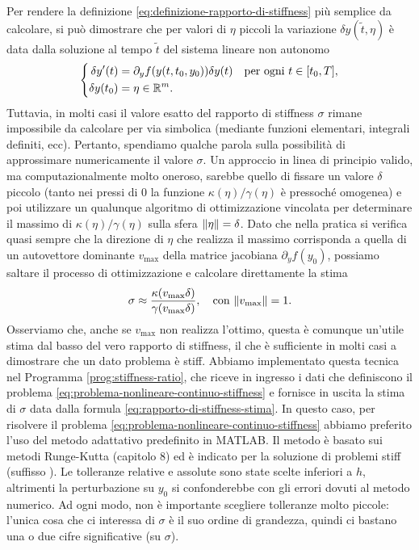 Per rendere la definizione \eqref{eq:definizione-rapporto-di-stiffness} più
semplice da calcolare, si può dimostrare che per valori di $\eta$ piccoli
la variazione $\delta y(\tilde{t},\eta)$ è data dalla soluzione al tempo $\tilde{t}$
del sistema lineare non autonomo
\[
\left\{
\begin{aligned}
\delta y'(t)  &= \partial_y f(y(t,t_0,y_0)) \delta y(t)
	\quad \text{per ogni $t \in [t_0,T]$}, \\
\delta y(t_0) &= \eta \in \mathbb{R}^m.
\end{aligned}
\right.
\]
Tuttavia, in molti casi il valore esatto del rapporto di stiffness $\sigma$
rimane impossibile da calcolare per via simbolica (mediante funzioni elementari,
integrali definiti, ecc). Pertanto, spendiamo qualche parola sulla possibilità
di approssimare numericamente il valore $\sigma$. Un approccio in linea
di principio valido, ma computazionalmente molto oneroso, sarebbe quello
di fissare un valore $\delta$ piccolo (tanto nei pressi di 0 la funzione
$\kappa(\eta)/\gamma(\eta)$ è pressoché omogenea) e poi utilizzare un
qualunque algoritmo di ottimizzazione vincolata per determinare il massimo
di $\kappa(\eta)/\gamma(\eta)$ sulla sfera $\left\lVert\eta\right\rVert = \delta$.
Dato che nella pratica si verifica quasi sempre che la direzione di $\eta$
che realizza il massimo corrisponda a quella di un autovettore dominante
$v_{\text{max}}$ della matrice jacobiana $\partial_y f(y_0)$, possiamo
saltare il processo di ottimizzazione e calcolare direttamente la stima
\begin{equation} \label{eq:rapporto-di-stiffness-stima}
\sigma \approx \frac{\kappa(v_{\text{max}}\delta)}{\gamma(v_{\text{max}}\delta)},
\quad \text{con $\left\lVert v_{\text{max}}\right\rVert = 1$}.
\end{equation}
Osserviamo che, anche se $v_{\text{max}}$ non realizza l'ottimo, questa è comunque
un'utile stima dal basso del vero rapporto di stiffness, il che è sufficiente
in molti casi a dimostrare che un dato problema è stiff.
Abbiamo implementato questa tecnica nel Programma \ref{prog:stiffness-ratio},
che riceve in ingresso i dati che definiscono il problema
\eqref{eq:problema-nonlineare-continuo-stiffness} e fornisce in uscita la
stima di $\sigma$ data dalla formula \eqref{eq:rapporto-di-stiffness-stima}.
In questo caso, per risolvere il problema
\eqref{eq:problema-nonlineare-continuo-stiffness} abbiamo preferito l'uso
del metodo adattativo  predefinito in MATLAB. Il metodo è
basato sui metodi Runge-Kutta (capitolo 8) ed è indicato per la soluzione
di problemi stiff (suffisso ).
Le tolleranze relative e assolute sono state scelte inferiori a $h$,
altrimenti la perturbazione su $y_0$ si confonderebbe con gli
errori dovuti al metodo numerico. Ad ogni modo, non è importante scegliere
tolleranze molto piccole: l'unica cosa che ci interessa di $\sigma$ è il suo
ordine di grandezza, quindi ci bastano una o due cifre significative (su $\sigma$).

